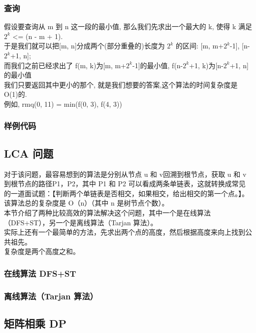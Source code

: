 \documentclass[a4paper]{article}
\begin{document}
\begin{CJK*}{UTF8}{gbsn}
\begin{multicols}{3}
\begin{flushleft}
\subsubsection{查询}
假设要查询从 m 到 n 这一段的最小值, 那么我们先求出一个最大的 k, 使得 k 满足 $2^k$ <= (n - m + 1).\\
于是我们就可以把[m, n]分成两个(部分重叠的)长度为 $2^k$ 的区间: [m, m+$2^k$-1], [n-$2^k$+1, n];\\
而我们之前已经求出了 f(m, k)为[m, m+$2^k$-1]的最小值, f(n-$2^k$+1, k)为[n-$2^k$+1, n]的最小值\\
我们只要返回其中更小的那个, 就是我们想要的答案,这个算法的时间复杂度是 O(1)的.\\
例如, rmq(0, 11) = min(f(0, 3), f(4, 3))\\


\subsubsection{样例代码}


\subsection{LCA 问题}
对于该问题，最容易想到的算法是分别从节点 u 和 v回溯到根节点，获取 u 和 v 到根节点的路径P1，P2，其中 P1 和 P2 可以看成两条单链表，这就转换成常见的一道面试题：【判断两个单链表是否相交，如果相交，给出相交的第一个点。】。\\
该算法总的复杂度是 O（n）（其中 n 是树节点个数）。\\
本节介绍了两种比较高效的算法解决这个问题，其中一个是在线算法（DFS+ST），另一个是离线算法（Tarjan 算法）。\\
实际上还有一个最简单的方法，先求出两个点的高度，然后根据高度来向上找到公共祖先。\\
复杂度是两个高度之和。

\subsubsection{在线算法 DFS+ST}


\subsubsection{离线算法（Tarjan 算法）}


\subsection{矩阵相乘 DP}


\end{flushleft}
\end{multicols}
\end{CJK*}
\end{document}
